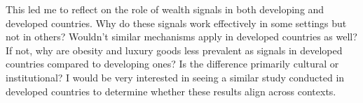 \documentclass[
  12pt]{article}
\begin{document}
This led me to reflect on the role of wealth signals in both developing
and developed countries. Why do these signals work effectively in some
settings but not in others? Wouldn't similar mechanisms apply in
developed countries as well? If not, why are obesity and luxury goods
less prevalent as signals in developed countries compared to developing
ones? Is the difference primarily cultural or institutional? I would be
very interested in seeing a similar study conducted in developed
countries to determine whether these results align across contexts.


  
\end{document}
